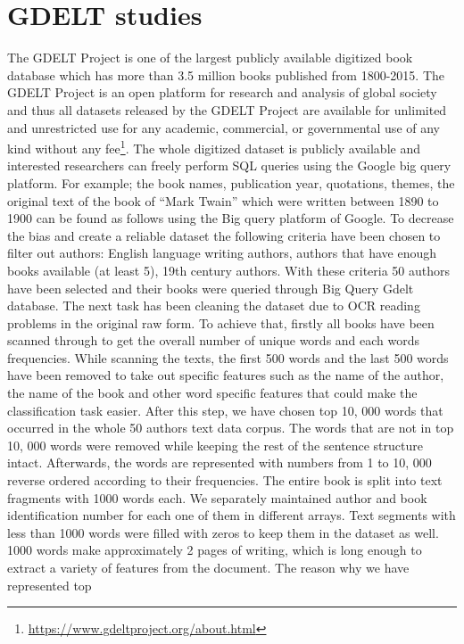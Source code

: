 \section{GDELT studies}
The GDELT Project is one of the largest publicly available digitized book database
which has more than 3.5 million books published from 1800-2015. The GDELT
Project is an open platform for research and analysis of global society and thus all
datasets released by the GDELT Project are available for unlimited and unrestricted
use for any academic, commercial, or governmental use of any kind without any
fee\footnote{\url{https://www.gdeltproject.org/about.html}}. The whole digitized dataset is publicly available and interested researchers
can freely perform SQL queries using the Google big query platform. For example;
the book names, publication year, quotations, themes, the original text of the book
of “Mark Twain” which were written between 1890 to 1900 can be found as follows
using the Big query platform of Google.
To decrease the bias and create a reliable dataset the following criteria have been
chosen to filter out authors: English language writing authors, authors that have
enough books available (at least 5), 19th century authors. With these criteria 50
authors have been selected and their books were queried through Big Query Gdelt
database. The next task has been cleaning the dataset due to OCR reading problems
in the original raw form. To achieve that, firstly all books have been scanned through
to get the overall number of unique words and each words frequencies. While scanning
the texts, the first 500 words and the last 500 words have been removed to take out
specific features such as the name of the author, the name of the book and other word
specific features that could make the classification task easier. After this step, we have
chosen top 10, 000 words that occurred in the whole 50 authors text data corpus. The
words that are not in top 10, 000 words were removed while keeping the rest of the
sentence structure intact.
Afterwards, the words are represented with numbers from
1 to 10, 000 reverse ordered according to their frequencies. The entire book is split
into text fragments with 1000 words each. We separately maintained author and
book identification number for each one of them in different arrays. Text segments
with less than 1000 words were filled with zeros to keep them in the dataset as well.
1000 words make approximately 2 pages of writing, which is long enough to extract a variety of features from the document. The reason why we have represented top

